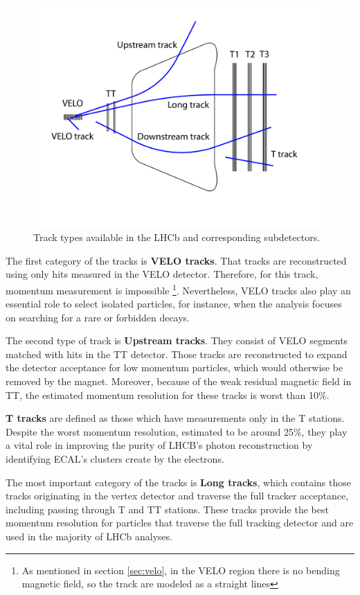 \begin{figure}
\centering
\includegraphics[scale=0.9]{figures/trackTypes.pdf}
\caption{Track types available in the LHCb and corresponding subdetectors. 
\label{fig:track_types}}
\end{figure}

The first category of the tracks is \textbf{VELO tracks}. That tracks are reconstructed using only hits measured in the VELO detector. Therefore, for this track, momentum measurement is impossible \footnote{As mentioned in section \ref{sec:velo}, in the VELO region there is no bending magnetic field, so the track are modeled as a straight lines}. Nevertheless, VELO tracks also play an essential role to select isolated particles, for instance, when the analysis focuses on searching for a rare or forbidden decays. 

The second type of track is \textbf{Upstream tracks}. They consist of VELO segments matched with hits in the TT detector. Those tracks are reconstructed to expand the detector acceptance for low momentum particles, which would otherwise be removed by the magnet. Moreover, because of the weak residual magnetic field in TT, the estimated momentum resolution for these tracks is worst than 10\%.

\textbf{T tracks} are defined as those which have measurements only in the T stations. Despite the worst momentum resolution, estimated to be around 25\%, they play a vital role in improving the purity of LHCB's photon reconstruction by identifying ECAL's clusters create by the electrons. 

The most important category of the tracks is \textbf{Long tracks}, which contains those tracks originating in the vertex detector and traverse the full tracker acceptance, including passing through T and TT stations. These tracks provide the best momentum resolution for particles that traverse the full tracking detector and are used in the majority of LHCb analyses.


